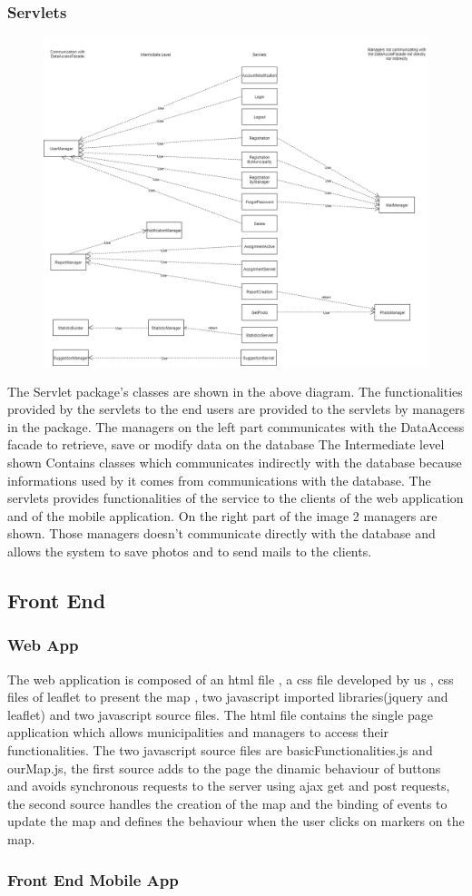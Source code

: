 \subsubsection{Servlets}
\begin{figure}[h]
\centering
\includegraphics[width=\textwidth]{Images/Servlets.png}
\end{figure}
The Servlet package's classes are shown in the above diagram.
The functionalities provided by the servlets to the end users are provided to the servlets by managers in the package. 
The managers  on the left part communicates with the DataAccess facade to retrieve, save or modify data on the database 
The Intermediate level shown Contains classes which communicates indirectly with the database because informations used by it comes from communications with the database. The servlets provides functionalities of the service to the clients of the web application and of the mobile application.
On the right part of the image 2 managers are shown. Those managers doesn't communicate directly with the database and allows the system to save photos and to send mails to the clients.
\clearpage
\subsection{Front End }
\subsubsection{Web App}
The web application is composed of an html file , a css file developed by us , css files of leaflet to present the map , two javascript imported libraries(jquery and leaflet) and two javascript source files.
The html file contains the single page application which allows municipalities and managers to access their functionalities.
The two javascript source files are basicFunctionalities.js and ourMap.js, the first source adds to the page the dinamic behaviour of buttons and avoids synchronous requests to the server using ajax get and post requests, the second source handles the creation of the map and the binding of events to update the map and defines the  behaviour when the user clicks on markers on the map.

\subsubsection{Front End Mobile App}
